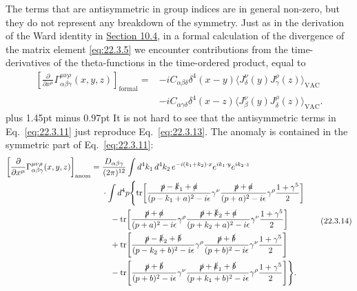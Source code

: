 The terms that are antisymmetric in group indices are in general non-zero,
but they do not represent any breakdown of the symmetry. Just as in the
derivation of the Ward identity in \hyperref[sec:10.4]{Section 10.4}, in a
formal calculation of the divergence of the matrix element
\eqref{eq:22.3.5} we encounter contributions from the time-derivatives of
the theta-functions in the time-ordered product, equal to
\begin{equation}
 \begin{aligned}
 \left[
  \frac{\partial}{\partial x^\mu}
  \Gamma_{\alpha\beta\gamma}^{\mu\nu\rho}(x,y,z)
 \right]_{\mathrm{formal}}
 ={}&-iC_{\alpha\beta\delta}\delta^4(x-y)
 \bigl\langle J_\delta^\nu(y)J_\gamma^\rho(z)\bigr\rangle_{\mathrm{VAC}}
 \\
 &-iC_{\alpha\gamma\delta}\delta^4(x-z)
 \bigl\langle J_\beta^\nu(y)J_\delta^\rho(z)\bigr\rangle_{\mathrm{VAC}}.
 \end{aligned}
 \tag{22.3.13}\label{eq:22.3.13}
\end{equation}
{\spaceskip=2.90pt plus 1.45pt minus 0.97pt
It is not hard to see that the antisymmetric terms in
Eq.~\eqref{eq:22.3.11} just reproduce
Eq.~\eqref{eq:22.3.13}.}
The anomaly
is contained in the symmetric part of Eq.~\eqref{eq:22.3.11}:
\begin{equation}
 \begin{aligned}
 \left[
  \frac{\partial}{\partial x^\mu}
  \Gamma_{\alpha\beta\gamma}^{\mu\nu\rho}(x,y,z)
 \right]_{\mathrm{anom}}
 ={}&\frac{D_{\alpha\beta\gamma}}{(2\pi)^{12}}
 \int d^4k_1\,d^4k_2\,
 e^{-i(k_1+k_2)\cdot x}e^{ik_1\cdot y}e^{ik_2\cdot z}
 \\
 &\cdot\int d^4p\Biggl\{
 \operatorname{tr}\!\left[
  \frac{\sl{p}-\sl{k}_1+\sl{a}}{(p-k_1+a)^2-i\epsilon}\gamma^\nu
  \frac{\sl{p}+\sl{a}}{(p+a)^2-i\epsilon}\gamma^\rho
  \frac{1+\gamma^5}{2}
 \right]
 \\
 &\quad-\operatorname{tr}\!\left[
  \frac{\sl{p}+\sl{a}}{(p+a)^2-i\epsilon}\gamma^\rho
  \frac{\sl{p}+\sl{k}_2+\sl{a}}{(p+k_2+a)^2-i\epsilon}\gamma^\nu
  \frac{1+\gamma^5}{2}
 \right]
 \\
 &\quad+\operatorname{tr}\!\left[
  \frac{\sl{p}-\sl{k}_2+\sl{b}}{(p-k_2+b)^2-i\epsilon}\gamma^\rho
  \frac{\sl{p}+\sl{b}}{(p+b)^2-i\epsilon}\gamma^\nu
  \frac{1+\gamma^5}{2}
 \right]
 \\
 &\quad-\operatorname{tr}\!\left[
  \frac{\sl{p}+\sl{b}}{(p+b)^2-i\epsilon}\gamma^\nu
  \frac{\sl{p}+\sl{k}_1+\sl{b}}{(p+k_1+b)^2-i\epsilon}\gamma^\rho
  \frac{1+\gamma^5}{2}
 \right]
 \Biggr\}.
 \end{aligned}
 \tag{22.3.14}\label{eq:22.3.14}
\end{equation}
